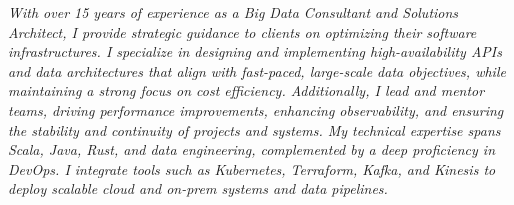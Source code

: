 

\vspace{1em}

\begin{cvparagraph}
    \emph{
        With over 15 years of experience as a Big Data Consultant and Solutions Architect, I provide strategic guidance to clients on optimizing their software infrastructures. I specialize in designing and implementing high-availability APIs and data architectures that align with fast-paced, large-scale data objectives, while maintaining a strong focus on cost efficiency. Additionally, I lead and mentor teams, driving performance improvements, enhancing observability, and ensuring the stability and continuity of projects and systems. My technical expertise spans Scala, Java, Rust, and data engineering, complemented by a deep proficiency in DevOps. I integrate tools such as Kubernetes, Terraform, Kafka, and Kinesis to deploy scalable cloud and on-prem systems and data pipelines.
    }
\end{cvparagraph}
